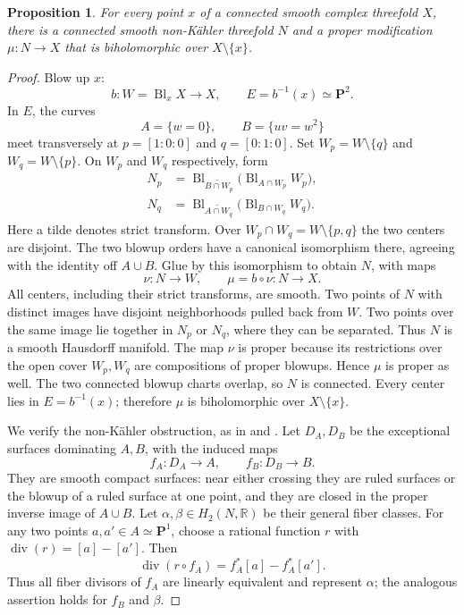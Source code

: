 \documentclass[11pt]{amsart}
\newtheorem{proposition}[theorem]{Proposition}
\theoremstyle{definition}
\theoremstyle{remark}
\numberwithin{equation}{section}
\newcommand{\R}{\mathbb R}
\newcommand{\PP}{\mathbf P}
\newcommand{\Bl}{\operatorname{Bl}}
\begin{document}
\begin{proposition}\label{prop:point-modification}
For every point $x$ of a connected smooth complex threefold $X$,
there is a connected smooth non-K\"ahler threefold $N$ and a proper
modification $\mu:N\to X$ that is biholomorphic over
$X\setminus\{x\}$.
\end{proposition}
\begin{proof}
Blow up $x$:
\[
 b:W=\Bl_xX\to X,\qquad E=b^{-1}(x)\simeq\PP^2.
\]
In $E$, the curves
\[
 A=\{w=0\},\qquad B=\{uv=w^2\}
\]
meet transversely at $p=[1:0:0]$ and $q=[0:1:0]$.
Set $W_p=W\setminus\{q\}$ and $W_q=W\setminus\{p\}$.
On $W_p$ and $W_q$ respectively, form
\[
 \begin{split}
 N_p&=\Bl_{\widetilde{B\cap W_p}}
             \bigl(\Bl_{A\cap W_p}W_p\bigr),\\
 N_q&=\Bl_{\widetilde{A\cap W_q}}
             \bigl(\Bl_{B\cap W_q}W_q\bigr).
 \end{split}
\]
Here a tilde denotes strict transform. Over
$W_p\cap W_q=W\setminus\{p,q\}$ the two centers are disjoint.
The two blowup orders have a canonical isomorphism there, agreeing
with the identity off $A\cup B$. Glue by this isomorphism to
obtain $N$, with maps
\[
 \nu:N\longrightarrow W,\qquad \mu=b\circ\nu:N\longrightarrow X.
\]
All centers, including their strict transforms, are smooth.
Two points of $N$ with distinct images have disjoint neighborhoods
pulled back from $W$. Two points over the same image lie together
in $N_p$ or $N_q$, where they can be separated. Thus $N$ is a
smooth Hausdorff manifold. The map $\nu$ is proper because its
restrictions over the open cover $W_p,W_q$ are compositions of
proper blowups. Hence $\mu$ is proper as well. The two connected
blowup charts overlap, so $N$ is connected. Every center lies in
$E=b^{-1}(x)$; therefore $\mu$ is biholomorphic over
$X\setminus\{x\}$.

We verify the non-K\"ahler obstruction, as in
\cite[Section~6]{Barlet2015} and \cite[Tag~08J1]{StacksHironaka}.
Let $D_A,D_B$ be the exceptional surfaces dominating $A,B$, with
the induced maps
\[
 f_A:D_A\longrightarrow A,\qquad f_B:D_B\longrightarrow B.
\]
They are smooth compact surfaces: near either crossing they are
ruled surfaces or the blowup of a ruled surface at one point, and
they are closed in the proper inverse image of $A\cup B$.
Let $\alpha,\beta\in H_2(N,\R)$ be their general fiber classes.
For any two points $a,a'\in A\simeq\PP^1$, choose a rational
function $r$ with $\operatorname{div}(r)=[a]-[a']$. Then
\[
 \operatorname{div}(r\circ f_A)=f_A^*[a]-f_A^*[a'].
\]
Thus all fiber divisors of $f_A$ are linearly equivalent and
represent $\alpha$; the analogous assertion holds for $f_B$ and
$\beta$.


\end{proof}
\end{document}
